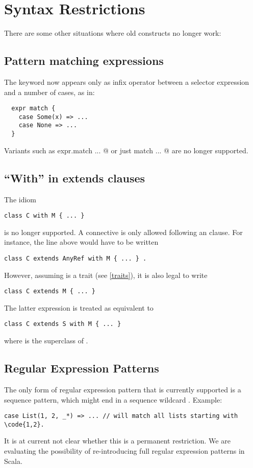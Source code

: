 \documentclass[a4paper,11pt,twoside]{article}
\begin{document}
\section{Syntax Restrictions}\label{restrictions}

There are some other situations where old constructs no longer work:

\subsection*{Pattern matching expressions} 

The \lstinline@match@
keyword now appears only as infix operator between a selector
expression and a number of cases, as in:
\begin{lstlisting}
  expr match {
    case Some(x) => ...
    case None => ...
  }
\end{lstlisting}
Variants such as \lstinline@ expr.match {...} @ 
or just
\lstinline@ match {...} @
are no longer supported.

\subsection*{``With'' in extends clauses}

The idiom
\begin{lstlisting}
class C with M { ... }
\end{lstlisting}
is no longer supported. A \lstinline@with@ connective is only allowed
following an \lstinline@extends@ clause. For instance, the line
above would have to be written
\begin{lstlisting}
class C extends AnyRef with M { ... } .
\end{lstlisting}
However, assuming \lstinline@M@ is a trait (see
\ref{traits}), it is also legal to write
\begin{lstlisting}
class C extends M { ... }
\end{lstlisting}
The latter expression is treated as equivalent to
\begin{lstlisting}
class C extends S with M { ... }
\end{lstlisting}
where \lstinline@S@ is the superclass of \lstinline@M@.

\subsection*{Regular Expression Patterns} 

The only form of regular
expression pattern that is currently supported is a sequence pattern,
which might end in a sequence wildcard \code{_*}. Example:
\begin{lstlisting}
case List(1, 2, _*) => ... // will match all lists starting with \code{1,2}.
\end{lstlisting}
It is at current not clear whether this is a permanent restriction. We
are evaluating the possibility of re-introducing full regular
expression patterns in Scala.
\end{document}
